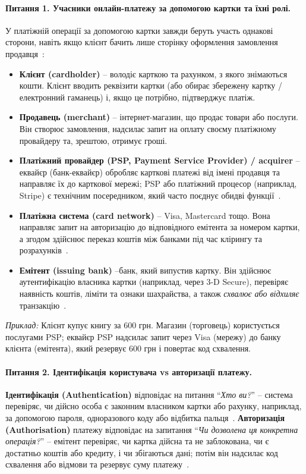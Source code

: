 \paragraph{Питання 1. Учасники онлайн-платежу за допомогою картки та їхні ролі.} У платіжній операції за допомогою 
картки завжди беруть участь однакові сторони, навіть якщо клієнт бачить лише сторінку оформлення замовлення продавця~\cite{stripe_card_process}:
\begin{itemize}[noitemsep]
    \item \textbf{Клієнт (cardholder)} -- володіє карткою та рахунком, з якого знімаються кошти. Клієнт вводить 
        реквізити картки (або обирає збережену картку / електронний гаманець) і, якщо це потрібно, підтверджує 
        платіж.
    \item \textbf{Продавець (merchant)} -- інтернет-магазин, що продає товари або послуги. Він створює замовлення, 
        надсилає запит на оплату своєму платіжному провайдеру та, зрештою, отримує гроші.
    \item \textbf{Платіжний провайдер (PSP, Payment Service Provider) / acquirer} -- еквайєр (банк-еквайєр) 
        обробляє карткові платежі від імені продавця та направляє їх до карткової мережі; PSP або платіжний процесор 
        (наприклад, Stripe) є технічним посередником, який часто поєднує обидві функції~\cite{stripe_card_process}.
    \item \textbf{Платіжна система (card network)} -- Visa, Mastercard тощо. Вона направляє запит на авторизацію 
        до відповідного емітента за номером картки, а згодом здійснює переказ коштів між банками під час клірингу 
        та розрахунків~\cite{stripe_card_process}.
    \item \textbf{Емітент (issuing bank)} --банк, який випустив картку. Він здійснює аутентифікацію власника картки 
            (наприклад, через 3-D Secure), перевіряє наявність коштів, ліміти та ознаки шахрайства, а також 
            \emph{схвалює або відхиляє} транзакцію~\cite{stripe_card_process}.
\end{itemize}
\textit{Приклад:} Клієнт купує книгу за 600 грн. Магазин (торговець) користується послугами PSP; еквайєр PSP 
надсилає запит через Visa (мережу) до банку клієнта (емітента), який резервує 600 грн і повертає код схвалення.

\paragraph{Питання 2. Ідентифікація користувача vs авторизації платежу.}
\textbf{Ідентифікація (Authentication)} відповідає на питання \enquote{\emph{Хто ви?}} -- система перевіряє, чи 
дійсно особа є законним власником картки або рахунку, наприклад, за допомогою пароля, одноразового коду або 
відбитка пальця~\cite{nist_80063b4}. \textbf{Авторизація (Authorisation)} платежу відповідає на запитання 
\enquote{\emph{Чи дозволена ця конкретна операція?}} -- емітент перевіряє, чи картка дійсна та не заблокована, 
чи є достатньо коштів або кредиту, і чи збігаються дані; потім він надсилає код схвалення або відмови та 
резервує суму платежу~\cite{stripe_card_process}.


